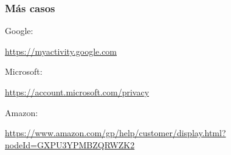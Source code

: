 \begin{frame}
  \frametitle{Más casos}

  {\Large
    
    Google:

    \begin{flushright}
      \url{https://myactivity.google.com}
    \end{flushright}

    Microsoft:
    
    \begin{flushright}
    \url{https://account.microsoft.com/privacy}
    \end{flushright}

    Amazon:
    
    \begin{flushright}
      \url{https://www.amazon.com/gp/help/customer/display.html?nodeId=GXPU3YPMBZQRWZK2}
    \end{flushright}
  }
\end{frame}
